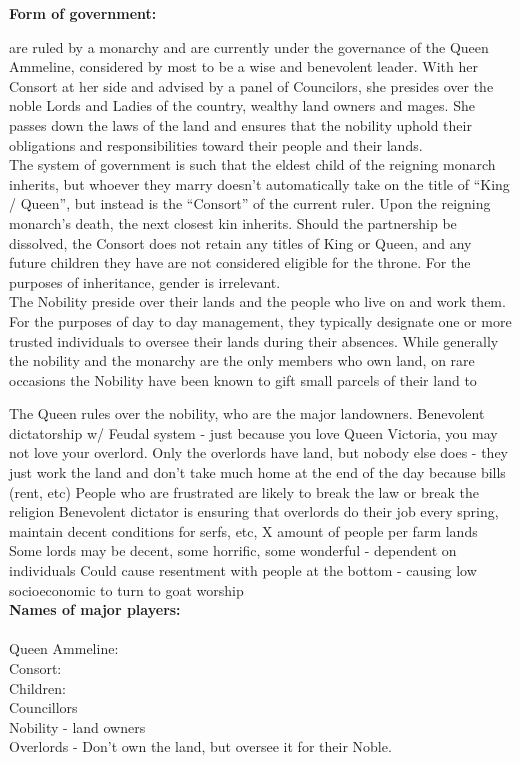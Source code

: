 \documentclass[blue]{GL2020}
\begin{document}
\name{\bAgrarians{}}

\textbf{Form of government:}

\pSun are ruled by a monarchy and are currently under the governance of the Queen Ammeline, considered by most to be a wise and benevolent leader.  With her Consort at her side and advised by a panel of Councilors, she presides over the noble Lords and Ladies of the country, wealthy land owners and mages.  She passes down the laws of the land and ensures that the nobility uphold their obligations and responsibilities toward their people and their lands.\\

The system of government is such that the eldest child of the reigning monarch inherits, but whoever they marry doesn't automatically take on the title of "`King / Queen"', but instead is the "`Consort"' of the current ruler.  Upon the reigning monarch's death, the next closest kin inherits.  Should the partnership be dissolved, the Consort does not retain any titles of King or Queen, and any future children they have are not considered eligible for the throne.  For the purposes of inheritance, gender is irrelevant.\\

The Nobility preside over their lands and the people who live on and work them.  For the purposes of day to day management, they typically designate one or more trusted individuals to oversee their lands during their absences.  While generally the nobility and the monarchy are the only members who own land, on rare occasions the Nobility have been known to gift small parcels of their land to 

The Queen rules over the nobility, who are the major landowners. Benevolent dictatorship w/ Feudal system - just because you love Queen Victoria, you may not love your overlord.  Only the overlords have land, but nobody else does - they just work the land and don’t take much home at the end of the day because bills (rent, etc)
People who are frustrated are likely to break the law or break the religion
Benevolent dictator is ensuring that overlords do their job every spring, maintain decent conditions for serfs, etc, X amount of people per farm lands
Some lords may be decent, some horrific, some wonderful - dependent on individuals
Could cause resentment with people at the bottom - causing low socioeconomic to turn to goat worship\\
 

\textbf{Names of major players:}
\\
\\Queen Ammeline:\\
Consort:\\
Children:\\
Councillors\\
Nobility - land owners\\
Overlords - Don't own the land, but oversee it for their Noble.\\
\end{document}
